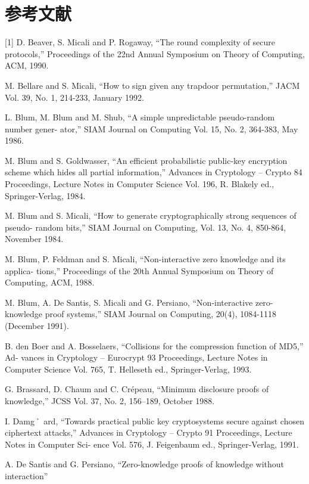 \documentclass[]{article}
\begin{document}
	\section*{参考文献}
    [1] D. Beaver, S. Micali and P. Rogaway, “The round complexity of secure protocols,”
    Proceedings of the 22nd Annual Symposium on Theory of Computing, ACM, 1990.\par
    [2] M. Bellare and S. Micali, “How to sign given any trapdoor permutation,” JACM Vol.
    39, No. 1, 214-233, January 1992.\par
    [3] L. Blum, M. Blum and M. Shub, “A simple unpredictable pseudo-random number gener-
    ator,” SIAM Journal on Computing Vol. 15, No. 2, 364-383, May 1986.\par
    [4] M. Blum and S. Goldwasser, “An efficient probabilistic public-key encryption scheme
    which hides all partial information,” Advances in Cryptology – Crypto 84 Proceedings, Lecture
    Notes in Computer Science Vol. 196, R. Blakely ed., Springer-Verlag, 1984.\par
    [5] M. Blum and S. Micali, “How to generate cryptographically strong sequences of pseudo-
    random bits,” SIAM Journal on Computing, Vol. 13, No. 4, 850-864, November 1984.\par
    [6] M. Blum, P. Feldman and S. Micali, “Non-interactive zero knowledge and its applica-
    tions,” Proceedings of the 20th Annual Symposium on Theory of Computing, ACM, 1988.\par
    [7] M. Blum, A. De Santis, S. Micali and G. Persiano, “Non-interactive zero-knowledge
    proof systems,” SIAM Journal on Computing, 20(4), 1084-1118 (December 1991).\par
    [8] B. den Boer and A. Bosselaers, “Collisions for the compression function of MD5,” Ad-
    vances in Cryptology – Eurocrypt 93 Proceedings, Lecture Notes in Computer Science Vol. 765,
    T. Helleseth ed., Springer-Verlag, 1993.\par
    [9] G. Brassard, D. Chaum and C. Crépeau, “Minimum disclosure proofs of knowledge,”
    JCSS Vol. 37, No. 2, 156–189, October 1988.\par
    [10] I. Damg˚ ard, “Towards practical public key cryptosystems secure against chosen ciphertext
    attacks,” Advances in Cryptology – Crypto 91 Proceedings, Lecture Notes in Computer Sci-
    ence Vol. 576, J. Feigenbaum ed., Springer-Verlag, 1991.\par
    [11] A. De Santis and G. Persiano, “Zero-knowledge proofs of knowledge without interaction”
\end{document}

